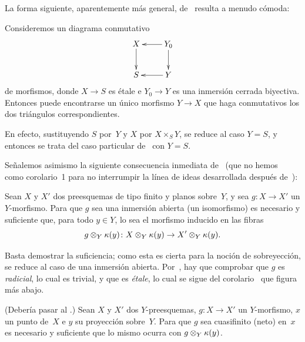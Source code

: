 La
forma siguiente, aparentemente más general, de~ resulta a menudo cómoda:

\begin{corollaire}
\label{I.5.6}
%
%
Consideremos un diagrama conmutativo
$$
\xymatrix{
X\ar[d]&\ar[l]Y_0\ar[d]\\
S&\ar[l]Y
}
$$
de morfismos, donde $X\to S$ es étale e $Y_0\to Y$ es una inmersión cerrada biyectiva. Entonces puede encontrarse un único morfismo $Y\to X$ que haga conmutativos los dos triángulos correspondientes.
\end{corollaire}

En efecto, sustituyendo $S$ por~$Y$ y $X$ por $X\times_S Y$, se reduce al caso $Y=S$, y entonces se trata del caso particular de~ con $Y=S$.

Señalemos asimismo la siguiente consecuencia inmediata de~ (que no hemos \ %
como corolario~1 para no interrumpir la línea de ideas desarrollada después de~):

\begin{proposition}
\label{I.5.7}
Sean $X$ y $X'$ dos preesquemas de tipo finito y planos sobre~$Y$, y sea $g\colon X\to X'$ un $Y$-morfismo. Para que $g$ sea una inmersión abierta (\resp un isomorfismo) es necesario y suficiente que, para todo $y\in Y$, lo sea el morfismo inducido en las fibras
$$
g\otimes_Y\kappa(y)\colon X\otimes_Y\kappa(y)\to X'\otimes_Y\kappa(y).
$$
\end{proposition}

Basta demostrar la suficiencia; como esta es cierta para la noción de sobreyección, se reduce al caso de una inmersión abierta. Por~, hay que comprobar que $g$ es \emph{radicial}, lo cual es trivial, y que es \emph{étale}, lo cual se sigue del corolario~ que figura más abajo.

\begin{corollaire}
\label{I.5.8}
(Debería pasar al \No{}.) Sean $X$ y $X'$ dos $Y$-preesquemas, $g\colon X\to X'$ un $Y$-morfismo, $x$ un punto de~$X$ e $y$ su proyección sobre~$Y$. Para que $g$ sea cuasifinito (\resp neto) en~$x$ es necesario y suficiente que lo mismo ocurra con $g\otimes_Y\kappa(y)$.
\end{corollaire}

